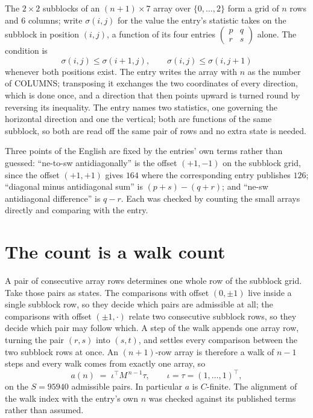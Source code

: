 \documentclass[11pt,a4paper]{article}
\theoremstyle{plain}
\theoremstyle{definition}
\begin{document}
The $2\times2$ subblocks of an $(n+1)\times7$ array over $\{0,\dots,2\}$ form a grid
of $n$ rows and $6$ columns; write $\sigma(i,j)$ for the value the entry's statistic takes on
the subblock in position $(i,j)$, a function of its four entries
$\begin{pmatrix}p&q\\r&s\end{pmatrix}$ alone. The condition is
\[
\sigma(i,j)\le\sigma(i+1,j),\qquad \sigma(i,j)\le\sigma(i,j+1)
\]
whenever both positions exist. The entry writes the array with $n$ as the number of COLUMNS; transposing it exchanges the two coordinates of every direction, which is done once, and a direction that then points upward is turned round by reversing its inequality. The entry names two statistics, one governing the horizontal direction and one the vertical; both are functions of the same subblock, so both are read off the same pair of rows and no extra state is needed.

Three points of the English are fixed by the entries' own terms rather than guessed:
``ne-to-sw antidiagonally'' is the offset $(+1,-1)$ on the subblock grid, since the offset
$(+1,+1)$ gives $164$ where the corresponding entry publishes $126$; ``diagonal minus
antidiagonal sum'' is $(p+s)-(q+r)$; and ``ne-sw antidiagonal difference'' is $q-r$. Each was
checked by counting the small arrays directly and comparing with the entry.

\section{The count is a walk count}

A pair of consecutive array rows determines one whole row of the subblock grid. Take those
pairs as states. The comparisons with offset $(0,\pm1)$ live inside a single subblock row, so
they decide which pairs are admissible at all; the comparisons with offset $(\pm1,\cdot)$
relate two consecutive subblock rows, so they decide which pair may follow which. A step of the
walk appends one array row, turning the pair $(r,s)$ into $(s,t)$, and settles every comparison
between the two subblock rows at once. An $(n+1)$-row array is therefore a walk of $n-1$ steps
and every walk comes from exactly one array, so
\[
a(n)\;=\;\iota^{\!\top}M^{\,n-1}\tau,\qquad \iota=\tau=(1,\dots,1)^{\!\top},
\]
on the $S=95940$ admissible pairs. In particular $a$ is $C$-finite. The alignment of the walk
index with the entry's own $n$ was checked against its published terms rather than assumed.
\end{document}
